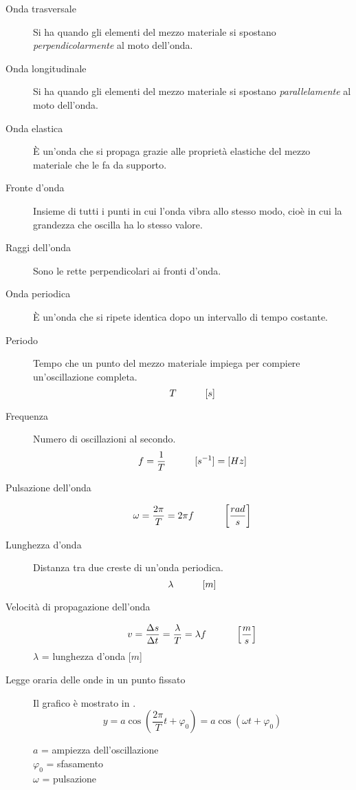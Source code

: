 \documentclass[a4paper,11pt,italian]{article}
\begin{document}
\begin{description}
  \item[Onda trasversale] 
  Si ha quando gli elementi del mezzo materiale si spostano \emph{perpendicolarmente} al moto dell'onda.
  
  \item[Onda longitudinale] 
  Si ha quando gli elementi del mezzo materiale si spostano \emph{parallelamente} al moto dell'onda.
  
  \item[Onda elastica] 
  È un'onda che si propaga grazie alle proprietà elastiche del mezzo materiale che le fa da supporto.
  
  \item[Fronte d'onda] 
  Insieme di tutti i punti in cui l'onda vibra allo stesso modo, cioè in cui la grandezza che oscilla ha lo stesso valore.
  
  \item[Raggi dell'onda] 
  Sono le rette perpendicolari ai fronti d'onda.
  
  \item[Onda periodica] 
  È un'onda che si ripete identica dopo un intervallo di tempo costante.
  
  \item[Periodo] 
  Tempo che un punto del mezzo materiale impiega per compiere un'oscillazione completa.
  \[ T \hspace*{3em} [s] \]
  
  \item[Frequenza] 
  Numero di oscillazioni al secondo.
  \[ f = \frac{1}{T} \hspace*{3em} [s^{-1}]=[ Hz] \]
  
  \item[Pulsazione dell'onda]
  \[ \omega = \frac{2\pi}{T} = 2\pi f \hspace*{3em} \left[ \frac{rad}{s} \right] \]
  
  \item[Lunghezza d'onda] Distanza tra due creste di un'onda periodica.
  \[ \lambda \hspace*{3em} [m] \]
  
  \item[Velocità di propagazione dell'onda] 
  \[ v = \frac{\Delta s}{\Delta t} = \frac{\lambda}{T} = \lambda f \hspace*{3em} \left[ \frac{m}{s} \right] \]
  $ \lambda $ = lunghezza d'onda [$ m $]
  
  \item[Legge oraria delle onde in un punto fissato] 
  Il grafico è mostrato in .
  \[ y = a \cos\left(\frac{2 \pi}{T}t + \varphi_0\right) = a \cos\left(\omega t + \varphi_0\right) \]
  \begin{multicols}{2}
  $ a $ = ampiezza dell'oscillazione\\
  $ \varphi_0 $ = sfasamento\\
  $ \omega $ = pulsazione
  \end{multicols}
  

\end{description}
\end{document}
